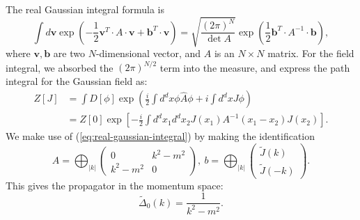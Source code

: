\begin{framedrmk}
The real Gaussian integral formula is
\begin{equation}
	\int d\bm v \exp\left(-\frac{1}{2}\bm{v}^T \cdot A\cdot \bm{v} + \bm{b}^T \cdot \bm{v}\right) 
	= \sqrt{\frac{(2\pi)^N}{\det{A}}}\exp\left(\frac{1}{2}\bm{b}^T \cdot A^{-1} \cdot \bm{b}\right),
	\label{eq:real-gaussian-integral}
\end{equation}
where $\bm v, \bm b$ are two $N$-dimensional vector, and $A$ is an $N\times N$ matrix.
For the field integral, we absorbed the $(2\pi)^{N/2}$ term into the measure, and express the path integral for the Gaussian field as:
\begin{equation*}
\begin{aligned}
	Z[J] &= \int D[\phi] \exp\left(\frac{i}{2}\int d^dx \phi \hat{A} \phi +i \int d^d xJ \phi\right) \\
	&= Z[0] \exp\left[-\frac{i}{2}\int d^d x_1 d^d x_2 J(x_1) A^{-1}(x_1-x_2) J(x_2)\right].
\end{aligned}
\end{equation*}
We make use of (\ref{eq:real-gaussian-integral}) by making the identification 
\begin{equation*}
	A = \bigoplus_{|k|} \left(
	\begin{array}{cc} 
		0 & k^2-m^2 \\ 
		k^2-m^2 & 0 
	\end{array}\right),\ 
	b = \bigoplus_{|k|} \left(
	\begin{array}{c}
		\tilde{J}(k) \\ 
		\tilde{J}(-k) 
	\end{array}\right).
\end{equation*}
This gives the propagator in the momentum space:
\begin{equation*}
	\tilde{\Delta}_0(k) = \frac{1}{k^2-m^2}.
\end{equation*}
\end{framedrmk}



